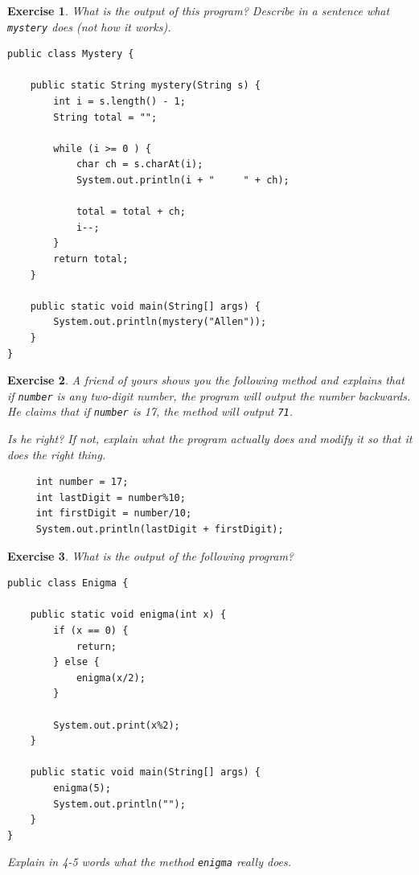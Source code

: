 \documentclass[12pt]{book}
\theoremstyle{exercise}
\newtheorem{exercise}{Exercise}[chapter]
\begin{document}
\begin{exercise}

What is the output of this program?  Describe in a sentence
what {\tt mystery} does (not how it works).

\begin{lstlisting}
public class Mystery {

    public static String mystery(String s) {
        int i = s.length() - 1;
        String total = "";

        while (i >= 0 ) {
            char ch = s.charAt(i);
            System.out.println(i + "     " + ch);

            total = total + ch;
            i--;
        }
        return total;
    }

    public static void main(String[] args) {
        System.out.println(mystery("Allen"));
    }
}
\end{lstlisting}

\end{exercise}


\begin{exercise}
A friend of yours shows you the following method and
explains that if {\tt number} is any two-digit number, the program
will output the number backwards.  He claims that if {\tt number} is
17, the method will output {\tt 71}.

Is he right?  If not, explain what the program actually does and
modify it so that it does the right thing.

\begin{lstlisting}
     int number = 17;
     int lastDigit = number%10;
     int firstDigit = number/10;
     System.out.println(lastDigit + firstDigit);
\end{lstlisting}

\end{exercise}

\begin{exercise}
What is the output of the following program?

\begin{lstlisting}
public class Enigma {

    public static void enigma(int x) {
        if (x == 0) {
            return;
        } else {
            enigma(x/2);
        }

        System.out.print(x%2);
    }

    public static void main(String[] args) {
        enigma(5);
        System.out.println("");
    }
}
\end{lstlisting}

Explain in 4-5 words what the method {\tt enigma} really does.
\end{exercise}
\end{document}
